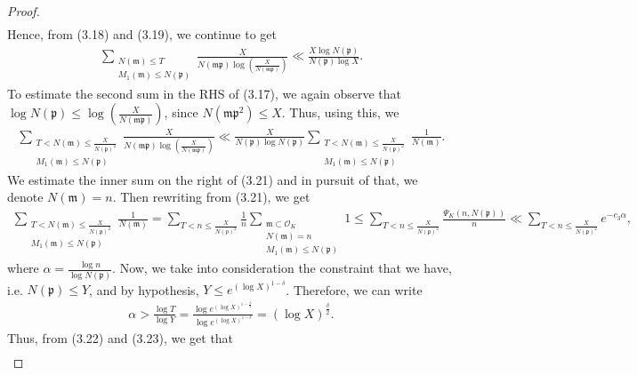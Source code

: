\documentclass[12pt]{article}
\numberwithin{equation}{section}
\numberwithin{equation}{section}
\begin{document}
\begin{proof}
\begin{align}
\end{align}
Hence, from (3.18) and (3.19), we continue to get
\begin{align}
    \sum_{\substack{N(\mathfrak{m}) \leq T \\ M_1(\mathfrak{m})\leq N(\mathfrak{p})}} \frac{X}{N(\mathfrak{mp})\log \left(\frac{X}{N(\mathfrak{mp})}\right)} \ll \frac{X\log N(\mathfrak{p})}{N(\mathfrak{p})\log X}.
\end{align}
To estimate the second sum in the RHS of (3.17), we again observe that $\log N(\mathfrak{p}) \leq \log\left(\frac{X}{N(\mathfrak{mp})}\right)$, since $N(\mathfrak{m}\mathfrak{p}^2) \leq X$. Thus, using this, we 
\begin{align}
    \sum_{\substack{T<N(\mathfrak{m}) \leq \frac{X}{N(\mathfrak{p})^2} \\ M_1(\mathfrak{m})\leq N(\mathfrak{p})}} \frac{X}{N(\mathfrak{mp})\log \left(\frac{X}{N(\mathfrak{mp})}\right)} \ll \frac{X}{N(\mathfrak{p})\log N(\mathfrak{p})}  \sum_{\substack{T<N(\mathfrak{m}) \leq \frac{X}{N(\mathfrak{p})^2} \\ M_1(\mathfrak{m})\leq N(\mathfrak{p})}} \frac{1}{N(\mathfrak{m})}.
\end{align}
We estimate the inner sum on the right of (3.21) and in pursuit of that, we denote $N(\mathfrak{m})=n$. Then rewriting from (3.21), we get 
\begin{align}
     \sum_{\substack{T<N(\mathfrak{m}) \leq \frac{X}{N(\mathfrak{p})^2} \\ M_1(\mathfrak{m})\leq N(\mathfrak{p})}} \frac{1}{N(\mathfrak{m})} = \sum_{T<n\leq \frac{X}{N(p)^2}} \frac{1}{n} \sum_{\substack{\mathfrak{m} \subset \mathcal{O}_K \\ N(\mathfrak{m})=n \\ M_1(\mathfrak{m}) \leq N(\mathfrak{p})}}1 \leq \sum_{T<n \leq \frac{X}{N(\mathfrak{p})^2}}\frac{\Psi_K(n,N(\mathfrak{p}))}{n} \ll \sum_{T<n\leq \frac{X}{N(\mathfrak{p})^2}} e^{-c_3\alpha} ,
\end{align}
where $\alpha =\frac{\log n}{\log N(\mathfrak{p})}$. Now, we take into consideration the constraint that we have, i.e. $N(\mathfrak{p}) \leq Y$, and by hypothesis, $Y \leq e^{(\log X)^{1-\delta}}$. Therefore, we can write
\begin{align}
    \alpha > \frac{\log T}{\log Y} = \frac{\log e^{(\log X)^{1-\frac{\delta}{2}}}}{\log e^{(\log X)^{1-\delta}}} = (\log X)^{\frac{\delta}{2}}.
\end{align}
Thus, from (3.22) and (3.23), we get that
\begin{align}

\end{align}
\end{proof}
\end{document}
